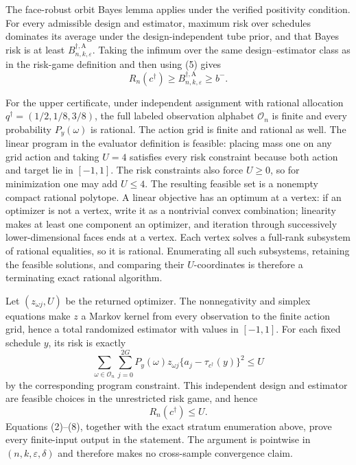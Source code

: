 The face-robust orbit Bayes lemma applies under the verified positivity condition.
For every admissible design and estimator, maximum risk over schedules dominates
its average under the design-independent tube prior, and that Bayes risk is at
least \(B_{n,k,\varepsilon}^{\dagger,\mathrm A}\).  Taking the infimum over the
same design--estimator class as in the risk-game definition and then using (5)
gives
\[
 R_n(c^\dagger)
 \ge B_{n,k,\varepsilon}^{\dagger,\mathrm A}
 \ge b^-.
\tag{6}
\]

For the upper certificate, under independent assignment with rational allocation
\(q^\dagger=(1/2,1/8,3/8)\), the full labeled observation alphabet
\(\mathcal O_n\) is finite and every probability \(P_y(\omega)\) is rational.
The action grid is finite and rational as well.  The linear program in the evaluator
definition is feasible: placing mass one on any grid action and taking \(U=4\)
satisfies every risk constraint because both action and target lie in
\([-1,1]\).  The risk constraints also force \(U\ge0\), so for minimization one
may add \(U\le4\).  The resulting feasible set is a nonempty compact rational
polytope.  A linear objective has an optimum at a vertex: if an optimizer is not a
vertex, write it as a nontrivial convex combination; linearity makes at least one
component an optimizer, and iteration through successively lower-dimensional faces
ends at a vertex.  Each vertex solves a full-rank subsystem of rational equalities,
so it is rational.  Enumerating all such subsystems, retaining the feasible
solutions, and comparing their \(U\)-coordinates is therefore a terminating exact
rational algorithm.

Let \((z_{\omega j},U)\) be the returned optimizer.  The nonnegativity and
simplex equations make \(z\) a Markov kernel from every observation to the finite
action grid, hence a total randomized estimator with values in \([-1,1]\).  For
each fixed schedule \(y\), its risk is exactly
\[
 \sum_{\omega\in\mathcal O_n}\sum_{j=0}^{2G}
 P_y(\omega)z_{\omega j}
 \{a_j-\tau_{c^\dagger}(y)\}^2\le U
\tag{7}
\]
by the corresponding program constraint.  This independent design and estimator
are feasible choices in the unrestricted risk game, and hence
\[
 R_n(c^\dagger)\le U.
\tag{8}
\]
Equations (2)--(8), together with the exact stratum enumeration above, prove every
finite-input output in the statement.  The argument is pointwise in
\((n,k,\varepsilon,\delta)\) and therefore makes no cross-sample convergence
claim.
